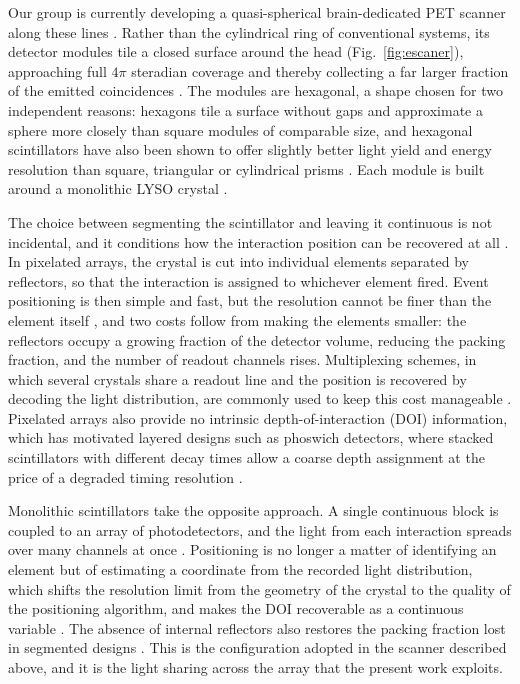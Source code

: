 \documentclass[10pt,conference]{IEEEtran}
\begin{document}
Our group is currently developing a quasi-spherical brain-dedicated PET
scanner along these lines \cite{perez-benito_sipm-based_2019}. Rather than
the cylindrical ring of conventional systems, its detector modules tile a
closed surface around the head (Fig.~\ref{fig:escaner}), approaching full $4\pi$ steradian coverage
and thereby collecting a far larger fraction of the emitted coincidences
\cite{perez-benito_sipm-based_2019}. The modules are hexagonal, a shape
chosen for two independent reasons: hexagons tile a surface without gaps and
approximate a sphere more closely than square modules of comparable size,
and hexagonal scintillators have also been shown to offer slightly better
light yield and energy resolution than square, triangular or cylindrical
prisms \cite{perez-benito_scintillator_2023}. Each module is built around a monolithic LYSO crystal
\cite{perez-benito_laser-microstructured_2025}.


The choice between segmenting the scintillator and leaving it continuous is
not incidental, and it conditions how the interaction position can be
recovered at all \cite{gonzalezmontoro2022}. In pixelated arrays, the
crystal is cut into individual elements separated by reflectors, so that the
interaction is assigned to whichever element fired. Event positioning is
then simple and fast, but the resolution cannot be finer than the element
itself \cite{moses2011}, and two costs follow from making the elements
smaller: the reflectors occupy a growing fraction of the detector volume,
reducing the packing fraction, and the number of readout channels rises.
Multiplexing schemes, in which several crystals share a readout line and the
position is recovered by decoding the light distribution, are commonly used
to keep this cost manageable \cite{sanaat2024}. Pixelated arrays also
provide no intrinsic depth-of-interaction (DOI) information, which has motivated
layered designs such as phoswich detectors, where stacked scintillators with
different decay times allow a coarse depth assignment at the price of a
degraded timing resolution \cite{sanaat2024}.

Monolithic scintillators take the opposite approach. A single continuous
block is coupled to an array of photodetectors, and the light from each
interaction spreads over many channels at once \cite{gonzalezmontoro2022}. 
Positioning is no longer a matter of identifying an element but of
estimating a coordinate from the recorded light distribution, which shifts
the resolution limit from the geometry of the crystal to the quality of the
positioning algorithm, and makes the DOI recoverable as a
continuous variable \cite{espana_digipet_2014}. The absence of internal reflectors
also restores the packing fraction lost in segmented designs
\cite{sanaat2024}. This is the configuration adopted in the scanner described above, and it is the light sharing across the array that the present work exploits.
\end{document}
